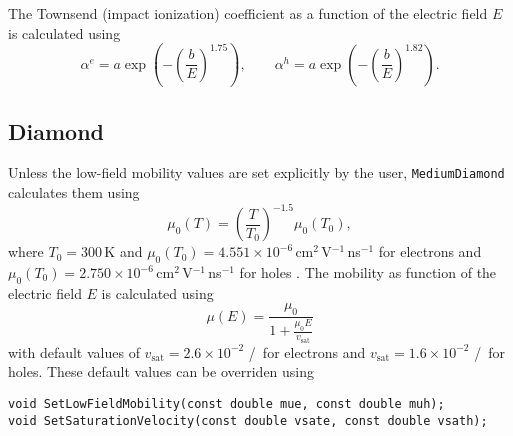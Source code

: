 The Townsend (impact ionization) coefficient as a function of the 
electric field $E$ is calculated using
\begin{equation*}
  \alpha^{e} = a \exp\left(-\left(\frac{b}{E}\right)^{1.75}\right), \qquad
  \alpha^{h} = a \exp\left(-\left(\frac{b}{E}\right)^{1.82}\right).
\end{equation*} 

\subsection{Diamond}
Unless the low-field mobility values are set explicitly by the user, 
\texttt{MediumDiamond} calculates them using 
\begin{equation*}
\mu_{0}\left(T\right) = \left(\frac{T}{T_{0}}\right)^{-1.5}\mu_{0}\left(T_{0}\right),
\end{equation*}
where $T_{0} = 300$\,K and
$\mu_{0}\left(T_{0}\right) = 4.551\times10^{-6}$\,cm$^{2}$\,V$^{-1}$\,ns$^{-1}$ 
for electrons and
$\mu_{0}\left(T_{0}\right) = 2.750\times10^{-6}$\,cm$^{2}$\,V$^{-1}$\,ns$^{-1}$ 
for holes \cite{Pomorski2008}.
The mobility as function of the electric field $E$ is calculated using
\begin{equation*}
  \mu\left(E\right) = \frac{\mu_{0}}{1 + \frac{\mu_{0}E}{v_{\text{sat}}}}
\end{equation*}
with default values of 
$v_{\text{sat}} = 2.6\times10^{-2}$\,\,/\, for 
electrons and 
$v_{\text{sat}} = 1.6\times10^{-2}$\,\,/\, for 
holes. 
These default values can be overriden using
\begin{lstlisting}
void SetLowFieldMobility(const double mue, const double muh);
void SetSaturationVelocity(const double vsate, const double vsath);
\end{lstlisting}
